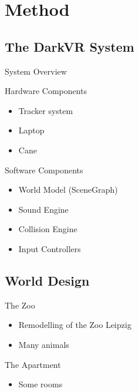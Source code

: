\documentclass{beamer}
\begin{document}
\section{Method}

\subsection{The DarkVR System}

\begin{frame}{System Overview}

\begin{block}{Hardware Components}
\begin{itemize}
  \item Tracker system
  \item Laptop
  \item Cane
\end{itemize}
\end{block}

\begin{block}{Software Components}
\begin{itemize}
  \item World Model (SceneGraph)
  \item Sound Engine
  \item Collision Engine
  \item Input Controllers
\end{itemize}
\end{block}

\end{frame}

\subsection{World Design}

\begin{frame}{The Zoo}

\begin{itemize}
  \item Remodelling of the Zoo Leipzig
  \item Many animals
\end{itemize}

\end{frame}

\begin{frame}{The Apartment}

\begin{itemize}
  \item Some rooms
\end{itemize}

\end{frame}
\end{document}
